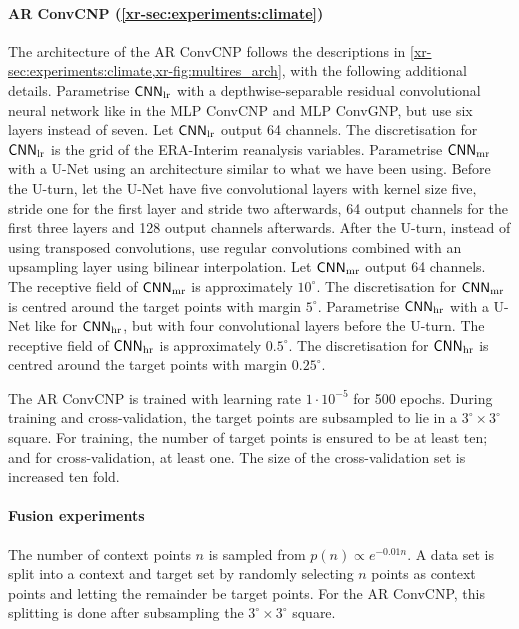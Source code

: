 \documentclass[12pt]{report}
\newcommand{\xrprefix}[1]{xr-#1}
\begin{document}
\paragraph{AR ConvCNP (\cref{\xrprefix{sec:experiments:climate}})}
The architecture of the AR ConvCNP follows the descriptions in \cref{\xrprefix{sec:experiments:climate},\xrprefix{fig:multires_arch}}, with the following additional details.
Parametrise $\mathsf{CNN}\ss{lr}$ with a depthwise-separable residual convolutional neural network like in the MLP ConvCNP and MLP ConvGNP, but use six layers instead of seven.
Let $\mathsf{CNN}\ss{lr}$ output 64 channels.
The discretisation for $\mathsf{CNN}\ss{lr}$ is the grid of the ERA-Interim reanalysis variables.
Parametrise $\mathsf{CNN}\ss{mr}$ with a U-Net \parencite{Ronneberger:2015:U-Net_Convolutional_Networks_for_Biomedical} using an architecture similar to what we have been using.
Before the U-turn, let the U-Net have five convolutional layers with kernel size five, stride one for the first layer and stride two afterwards, 64 output channels for the first three layers and 128 output channels afterwards.
After the U-turn, instead of using transposed convolutions, use regular convolutions combined with an upsampling layer using bilinear interpolation.
Let $\mathsf{CNN}\ss{mr}$ output 64 channels.
The receptive field of $\mathsf{CNN}\ss{mr}$ is approximately $10^\circ$.
The discretisation for $\mathsf{CNN}\ss{mr}$ is centred around the target points with margin $5^\circ$.
Parametrise $\mathsf{CNN}\ss{hr}$ with a U-Net like for $\mathsf{CNN}\ss{hr}$, but with four convolutional layers before the U-turn.
The receptive field of $\mathsf{CNN}\ss{hr}$ is approximately $0.5^\circ$.
The discretisation for $\mathsf{CNN}\ss{hr}$ is centred around the target points with margin $0.25^\circ$.

The AR ConvCNP is trained with learning rate $1 \cdot 10^{-5}$ for 500 epochs.
During training and cross-validation, the target points are subsampled to lie in a $3^\circ\times3^\circ$ square.
For training, the number of target points is ensured to be at least ten;
and for cross-validation, at least one.
The size of the cross-validation set is increased ten fold.

\paragraph{Fusion experiments}
The number of context points $n$ is sampled from $p(n) \propto e^{-0.01n}$.
A data set is split into a context and target set by randomly selecting $n$ points as context points and letting the remainder be target points.
For the AR ConvCNP, this splitting is done after subsampling the $3^\circ\times3^\circ$ square.
\end{document}

